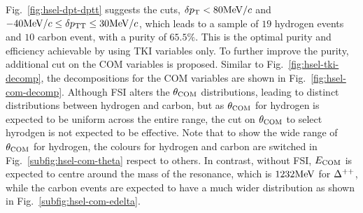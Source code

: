      Fig.~\ref{fig:hsel-dpt-dptt} suggests the cuts, $\delta p_\textrm{T} < 80\textrm{MeV}/c$ and $-40\textrm{MeV}/c \leq \delta p_\textrm{TT} \leq 30\textrm{MeV}/c$, which leads to a sample of $19$ hydrogen events and $10$ carbon event, with a purity of $65.5\%$.
     This is the optimal purity and efficiency achievable by using TKI variables only.
     To further improve the purity, additional cut on the COM variables is proposed.
     Similar to Fig.~\ref{fig:hsel-tki-decomp}, the decompositions for the COM variables are shown in Fig.~\ref{fig:hsel-com-decomp}.
     Although FSI alters the $\theta_{\textrm{COM}}$ distributions, leading to distinct distributions between hydrogen and carbon, but as $\theta_{\textrm{COM}}$ for hydrogen is expected to be uniform across the entire range, the cut on $\theta_{\textrm{COM}}$ to select hyrodgen is not expected to be effective.
     Note that to show the wide range of $\theta_{\textrm{COM}}$ for hydrogen, the colours for hydrogen and carbon are switched in Fig.~\ref{subfig:hsel-com-theta} respect to others.
     In contrast, without FSI, $E_{\textrm{COM}}$ is expected to centre around the mass of the resonance, which is $1232\textrm{MeV}$ for $\Delta^{++}$, while the carbon events are expected to have a much wider distribution as shown in Fig.~\ref{subfig:hsel-com-edelta}.
